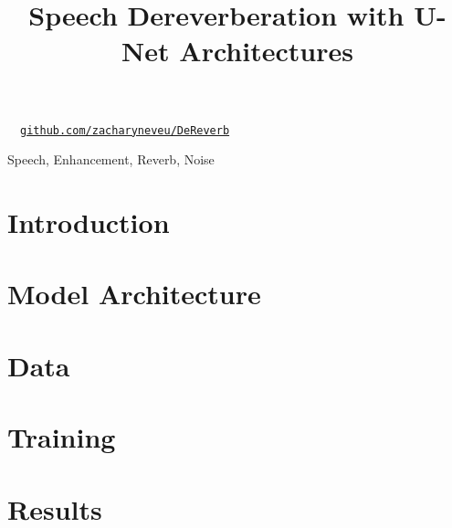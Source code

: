 \documentclass{article}
\title{Speech Dereverberation with U-Net Architectures}
\begin{document}
%

\maketitle
%

\begin{center}
\ \ \href{https://github.com/zacharyneveu/DeReverb}{\texttt{github.com/zacharyneveu/DeReverb}}
\end{center}

\begin{abstract}

\end{abstract}
%
\begin{keywords}
Speech, Enhancement, Reverb, Noise
\end{keywords}
%
\section{Introduction}
\label{sec:intro}


\section{Model Architecture}%
\label{sec:model_architecture}


\section{Data}%
\label{sec:data}


\section{Training}%
\label{sec:data_and_training}


\section{Results}%
\label{sec:results}






\end{document}
